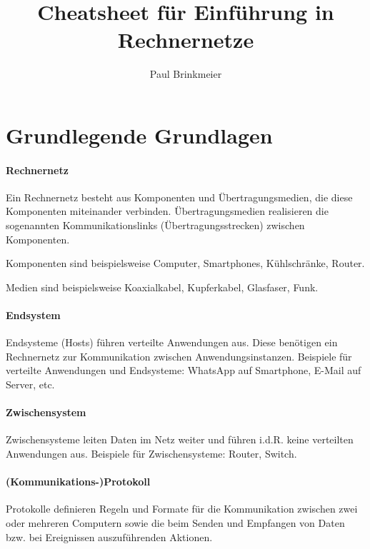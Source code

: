 \documentclass[a4paper, 14pt]{article}
\author{Paul Brinkmeier}
\title{Cheatsheet für Einführung in Rechnernetze}
\begin{document}
	\maketitle
	\newpage
	\tableofcontents
	\newpage

	\raggedright

	\section{Grundlegende Grundlagen}

	\paragraph{Rechnernetz}

	Ein Rechnernetz besteht aus Komponenten und Übertragungsmedien, die diese Komponenten miteinander verbinden.
	Übertragungsmedien realisieren die sogenannten Kommunikationslinks (Übertragungsstrecken) zwischen Komponenten.

	Komponenten sind beispielsweise Computer, Smartphones, Kühlschränke, Router.

	Medien sind beispielsweise Koaxialkabel, Kupferkabel, Glasfaser, Funk.

	\paragraph{Endsystem}

	Endsysteme (Hosts) führen verteilte Anwendungen aus.
	Diese benötigen ein Rechnernetz zur Kommunikation zwischen Anwendungsinstanzen.
	Beispiele für verteilte Anwendungen und Endsysteme: WhatsApp auf Smartphone, E-Mail auf Server, etc.

	\paragraph{Zwischensystem}

	Zwischensysteme leiten Daten im Netz weiter und führen i.d.R. keine verteilten Anwendungen aus.
	Beispiele für Zwischensysteme: Router, Switch.

	\paragraph{(Kommunikations-)Protokoll}

	Protokolle definieren Regeln und Formate für die Kommunikation zwischen zwei oder mehreren Computern sowie die beim Senden und Empfangen von Daten bzw. bei Ereignissen auszuführenden Aktionen.
\end{document}
